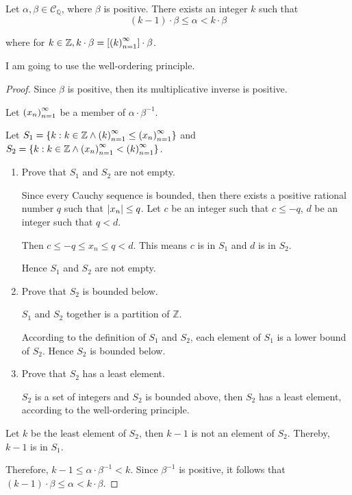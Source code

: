 \begin{theorem}
    Let $\alpha, \beta\in\mathscr{C}_{\mathbb{Q}}$, where $\beta$ is positive. There exists an integer $k$ such that
    \[
        (k-1)\cdot\beta \le \alpha < k\cdot\beta
    \]

    where for $k\in\mathbb{Z}, k\cdot\beta = \left[{{\left({k}\right)}^{\infty}_{n=1}}\right]\cdot\beta$.
\end{theorem}

I am going to use the well-ordering principle.

\begin{proof}
    Since $\beta$ is positive, then its multiplicative inverse is positive.

    Let ${\left({x_{n}}\right)}^{\infty}_{n=1}$ be a member of $\alpha\cdot{\beta}^{-1}$.

    Let $S_{1} = \{ k : k\in\mathbb{Z} \land {\left({k}\right)}^{\infty}_{n=1} \le {\left({x_{n}}\right)}^{\infty}_{n=1} \}$ and $S_{2} = \{ k : k\in\mathbb{Z}\land {\left({x_{n}}\right)}^{\infty}_{n=1} < {\left({k}\right)}^{\infty}_{n=1} \}$.

    \begin{enumerate}[label={\textbf{Step \arabic*.}},itemindent=0.5cm]
        \item Prove that $S_{1}$ and $S_{2}$ are not empty.

              Since every Cauchy sequence is bounded, then there exists a positive rational number $q$ such that $\left\vert{x_{n}}\right\vert\le q$. Let $c$ be an integer such that $c \le -q$, $d$ be an integer such that $q < d$.

              Then $c \le -q \le x_{n} \le q < d$. This means $c$ is in $S_{1}$ and $d$ is in $S_{2}$.

              Hence $S_{1}$ and $S_{2}$ are not empty.
        \item Prove that $S_{2}$ is bounded below.

              $S_{1}$ and $S_{2}$ together is a partition of $\mathbb{Z}$.

              According to the definition of $S_{1}$ and $S_{2}$, each element of $S_{1}$ is a lower bound of $S_{2}$. Hence $S_{2}$ is bounded below.
        \item Prove that $S_{2}$ has a least element.

              $S_{2}$ is a set of integers and $S_{2}$ is bounded above, then $S_{2}$ has a least element, according to the well-ordering principle.
    \end{enumerate}

    Let $k$ be the least element of $S_{2}$, then $k-1$ is not an element of $S_{2}$. Thereby, $k-1$ is in $S_{1}$.

    Therefore, $k-1 \le \alpha\cdot{\beta}^{-1} < k$. Since ${\beta}^{-1}$ is positive, it follows that $(k-1)\cdot\beta \le \alpha < k\cdot\beta$.
\end{proof}

